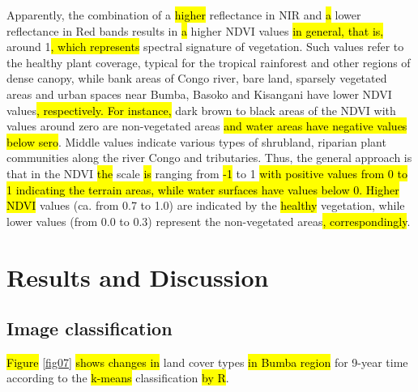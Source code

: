 \documentclass[applsci,article,submit,pdftex,moreauthors]{Definitions/mdpi}
\begin{document}
Apparently, the combination of a \hl{higher} reflectance in NIR and \hl{a} lower reflectance in\hl{ }Red bands\hl{ }results in \hl{a} higher NDVI values \hl{in general, that is, }around 1\hl{, which represents} spectral signature of vegetation. Such values refer to the healthy plant coverage, typical for the tropical rainforest and other regions of dense canopy, while bank areas of Congo river, bare land, sparsely vegetated areas and urban spaces near Bumba, Basoko and Kisangani have lower NDVI values\hl{, respectively. For instance, }dark brown to black areas of the NDVI with values around zero are non-vegetated areas \hl{and water areas have negative values below sero}. Middle values indicate various types of shrubland, riparian plant communities along the river Congo and tributaries. Thus, the general approach is that in the NDVI \hl{the} scale \hl{is} ranging from \hl{-1} to 1 \hl{with positive values from 0 to 1 indicating the terrain areas, while water surfaces have values below 0. Higher NDVI} values (ca. from 0.7 to 1.0) are indicated by the \hl{healthy }vegetation, while lower values (from 0.0 to 0.3) represent the non-vegetated areas\hl{, correspondingly}. 

\section{Results and Discussion}

\subsection{Image classification}

\hl{Figure} \ref{fig07} \hl{shows changes in} land cover types\hl{ in Bumba region }for 9-year time\hl{ }according to the\hl{ k-means }classification \hl{by R}.
\end{document}
